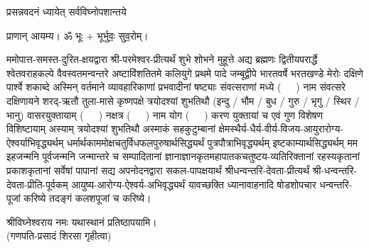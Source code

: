 
\setlength{\parindent}{0pt}




{प्रसन्नवदनं ध्यायेत् सर्वविघ्नोपशान्तये}

प्राणान्  आयम्य।  ॐ भूः + भूर्भुवः॒ सुव॒रोम्।


ममोपात्त-समस्त-दुरित-क्षयद्वारा श्री-परमेश्वर-प्रीत्यर्थं शुभे शोभने मुहूत्ते अद्य ब्रह्मणः
द्वितीयपरार्द्धे श्वेतवराहकल्पे वैवस्वतमन्वन्तरे अष्टाविंशतितमे कलियुगे प्रथमे पादे
जम्बूद्वीपे भारतवर्षे भरतखण्डे मेरोः दक्षिणे पार्श्वे शकाब्दे अस्मिन् वर्तमाने व्यावहारिकाणां प्रभवादीनां षष्ट्याः संवत्सराणां मध्ये \mbox{(~~~)} नाम संवत्सरे दक्षिणायने 
शरद्-ऋतौ  तुला-मासे कृष्णपक्षे त्रयोदश्यां शुभतिथौ
(इन्दु / भौम / बुध / गुरु / भृगु / स्थिर / भानु) वासरयुक्तायाम्
\mbox{(~~~)} नक्षत्र \mbox{(~~~)} नाम  योग  \mbox{(~~~)} करण युक्तायां च एवं गुण विशेषण विशिष्टायाम्
अस्याम् त्रयोदश्यां शुभतिथौ 
अस्माकं सहकुटुम्बानां क्षेमस्थैर्य-धैर्य-वीर्य-विजय-आयुरारोग्य-ऐश्वर्याभिवृद्ध्यर्थम्
धर्मार्थकाममोक्ष\-चतुर्विधफलपुरुषार्थसिद्ध्यर्थं पुत्रपौत्राभि\-वृद्ध्यर्थम् इष्टकाम्यार्थसिद्ध्यर्थम्
मम इहजन्मनि पूर्वजन्मनि जन्मान्तरे च सम्पादितानां ज्ञानाज्ञानकृतमहा\-पातकचतुष्टय-व्यतिरिक्तानां रहस्यकृतानां प्रकाशकृतानां सर्वेषां पापानां सद्य अपनोदनद्वारा सकल-पापक्षयार्थं
श्रीधन्वन्तरि-देवता-प्रीत्यर्थं श्री-धन्वन्तरि-देवता-प्रीति-पूर्वकम् आयुष्य-आरोग्य-ऐश्वर्य-अभिवृद्ध्यर्थं 
यावच्छक्ति ध्यानावाहनादि 
षोडशोपचार धन्वन्तरि-पूजां करिष्ये तदङ्गं कलशपूजां च करिष्ये।


श्रीविघ्नेश्वराय नमः यथास्थानं प्रतिष्ठापयामि।\\
(गणपति-प्रसादं शिरसा गृहीत्वा)













